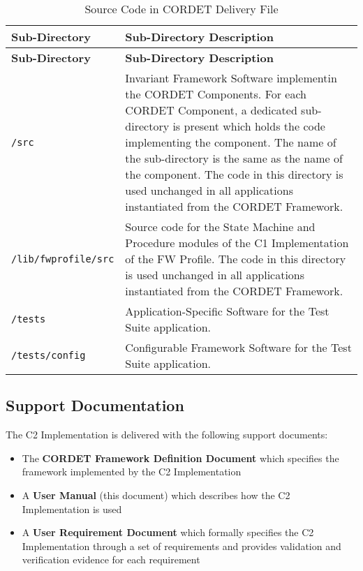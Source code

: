 \documentclass{pnp_article}
\begin{document}
\begin{longtable}{|l|p{9cm}|}
\caption{Source Code in CORDET Delivery File}\label{tab:srcCrDeliveryFile} \\
\hline
\rowcolor{light-gray}
\textbf{Sub-Directory} & \textbf{Sub-Directory Description}\\
\endfirsthead
\rowcolor{light-gray}
\textbf{Sub-Directory} & \textbf{Sub-Directory Description}\\
\hline\hline
\endhead

\texttt{/src} & Invariant Framework Software implementin the CORDET Components. For each CORDET Component, a dedicated sub-directory is present which holds the code implementing the component. The name of the sub-directory is the same as the name of the component. The code in this directory is used unchanged in all applications instantiated from the CORDET Framework. \\
\hline
\texttt{/lib/fwprofile/src} & Source code for the State Machine and Procedure modules of the C1 Implementation of the FW Profile. The code in this directory is used unchanged in all applications instantiated from the CORDET Framework. \\
\hline
\texttt{/tests} & Application-Specific Software for the Test Suite application. \\
\hline
\texttt{/tests/config} & Configurable Framework Software for the Test Suite application. \\
\hline
\end{longtable}


\newpage
\subsection{Support Documentation}\label{sec:SupportDoc}
The C2 Implementation is delivered with the following support documents: 

\begin{itemize}
\item The \textbf{CORDET Framework Definition Document} which specifies the framework implemented by the C2 Implementation
\item A \textbf{User Manual} (this document) which describes how the C2 Implementation is used
\item A \textbf{User Requirement Document} which formally specifies the C2 Implementation
through a set of requirements and provides validation and verification evidence for each requirement
\end{itemize}
\end{document}
